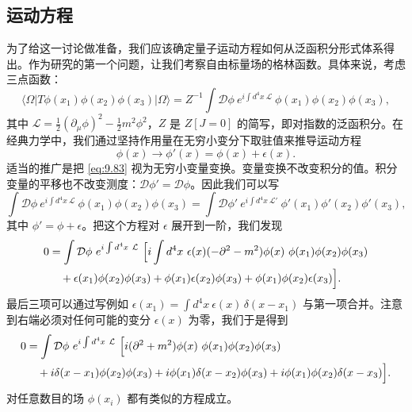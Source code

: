 \subsection{运动方程}

为了给这一讨论做准备，我们应该确定量子运动方程如何从泛函积分形式体系得出。作为研究的第一个问题，让我们考察自由标量场的格林函数。具体来说，考虑三点函数：
\begin{equation}
  \langle\Omega|T\phi(x_1)\phi(x_2)\phi(x_3)|\Omega\rangle
  = Z^{-1}\int \mathcal{D}\phi\ e^{i\int d^4x\ \mathcal{L}}\
    \phi(x_1)\phi(x_2)\phi(x_3) ,
  \label{eq:9.82}
\end{equation}
其中 $\mathcal{L} = \tfrac{1}{2}(\partial_\mu\phi)^2 - \tfrac{1}{2}m^2\phi^2$，$Z$ 是 $Z[J=0]$ 的简写，即对指数的泛函积分。在经典力学中，我们通过坚持作用量在无穷小变分下取驻值来推导运动方程
\begin{equation}
  \phi(x) \to \phi'(x) = \phi(x) + \epsilon(x) .
  \label{eq:9.83}
\end{equation}
适当的推广是把 \eqref{eq:9.83} 视为无穷小变量变换。变量变换不改变积分的值。积分变量的平移也不改变测度：$\mathcal{D}\phi' = \mathcal{D}\phi$。因此我们可以写
\begin{equation}
  \int \mathcal{D}\phi\ e^{i\int d^4x\ \mathcal{L}}\ \phi(x_1)\phi(x_2)
    \phi(x_3) = \int \mathcal{D}\phi'\ e^{i\int d^4x\ \mathcal{L}'}\
    \phi'(x_1)\phi'(x_2)\phi'(x_3) ,
\end{equation}
其中 $\phi' = \phi + \epsilon$。把这个方程对 $\epsilon$ 展开到一阶，我们发现
\begin{equation}
  \begin{aligned}
    0 &= \int \mathcal{D}\phi\ e^{i\int d^4x\ \mathcal{L}}\ \Bigl[
      i\int d^4x\ \epsilon(x)(-\partial^2-m^2)\phi(x)\ \phi(x_1)\phi(x_2)
        \phi(x_3)\\
    &\quad + \epsilon(x_1)\phi(x_2)\phi(x_3) + \phi(x_1)\epsilon(x_2)\phi(x_3)
      + \phi(x_1)\phi(x_2)\epsilon(x_3) \Bigr] .
  \end{aligned}
  \label{eq:9.84}
\end{equation}
最后三项可以通过写例如 $\epsilon(x_1) = \int d^4x\ \epsilon(x)\,\delta(x-x_1)$ 与第一项合并。注意到右端必须对任何可能的变分 $\epsilon(x)$ 为零，我们于是得到
\begin{equation}
  \begin{aligned}
    0 &= \int \mathcal{D}\phi\ e^{i\int d^4x\ \mathcal{L}}\ \Bigl[
      i(\partial^2+m^2)\phi(x)\ \phi(x_1)\phi(x_2)\phi(x_3)\\
    &\quad + i\delta(x-x_1)\phi(x_2)\phi(x_3) + i\phi(x_1)\delta(x-x_2)
      \phi(x_3) + i\phi(x_1)\phi(x_2)\delta(x-x_3) \Bigr] .
  \end{aligned}
  \label{eq:9.85}
\end{equation}
对任意数目的场 $\phi(x_i)$ 都有类似的方程成立。

